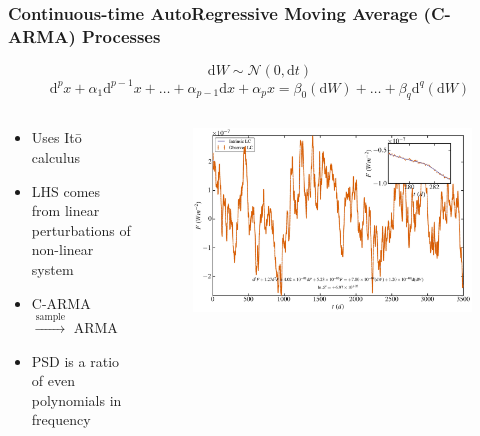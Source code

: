 \documentclass[hyperref={pdfpagelabels=false}]{beamer}
\begin{document}
\begin{frame}
\frametitle{Continuous-time AutoRegressive Moving Average (C-ARMA) Processes}
  \begin{equation*} \mathrm{d}W \sim \mathcal{N}(0,\mathrm{d}t) \end{equation*}
  \begin{equation*}\label{eq:CARMA} \mathrm{d}^{p}x + \alpha_{1} \mathrm{d}^{p-1}x + \ldots + \alpha_{p-1} \mathrm{d}x + \alpha_{p}x = \beta_{0} (\mathrm{d}W) + \ldots + \beta_{q} \mathrm{d}^{q}(\mathrm{d}W) \end{equation*}
  \begin{columns}
    \centering
    \begin{column}{0.5\textwidth}
      \begin{itemize}
        \item Uses It\={o} calculus {\tiny \citet{Brockwell14,Davis,Kelly14}}
        \item LHS comes from linear perturbations of non-linear system
        \item C-ARMA $\overset{\mathrm{sample}}\longrightarrow$ ARMA
        \item PSD is a ratio of even polynomials in frequency
      \end{itemize}
    \end{column}
    \begin{column}{0.5\textwidth}
      \begin{figure}
        \includegraphics[scale=0.0425]{images/CARMA(3,1)_LC.jpg}
      \end{figure}
    \end{column}
  \end{columns}
\end{frame}
\end{document}
